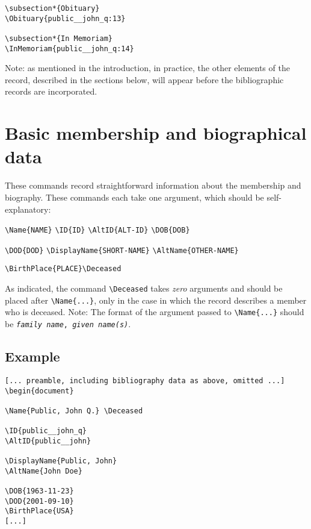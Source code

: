 \documentclass[letterpaper]{article}
\begin{document}
\begin{verbatim}
\subsection*{Obituary}
\Obituary{public__john_q:13}       

\subsection*{In Memoriam}
\InMemoriam{public__john_q:14}
\end{verbatim}

Note: as mentioned in the introduction, in practice, the other
elements of the record, described in the sections below, will appear
before the bibliographic records are incorporated.


\section{Basic membership and biographical data}

These commands record straightforward information about the membership
and biography.  These commands each take one argument, which should be
self-explanatory:

\begin{mdframed}
\verb|\Name{NAME}|\quad
\verb|\ID{ID}|\quad
\verb|\AltID{ALT-ID}|\quad
\verb|\DOB{DOB}|

\verb|\DOD{DOD}|\quad
\verb|\DisplayName{SHORT-NAME}|\quad
\verb|\AltName{OTHER-NAME}|

\verb|\BirthPlace{PLACE}|\quad \verb|\Deceased|
\end{mdframed}

As indicated, the command \verb|\Deceased| takes \emph{zero} arguments
and should be placed after \verb|\Name{...}|, only in the case in
which the record describes a member who is deceased.  Note: The format
of the argument passed to \verb|\Name{...}| should be
\texttt{\emph{family name}, \emph{given name(s)}}.

\subsection*{Example}

\begin{verbatim}
[... preamble, including bibliography data as above, omitted ...]
\begin{document}

\Name{Public, John Q.} \Deceased

\ID{public__john_q}
\AltID{public__john}

\DisplayName{Public, John}
\AltName{John Doe}

\DOB{1963-11-23}
\DOD{2001-09-10}
\BirthPlace{USA}
[...]
\end{verbatim}
\end{document}
